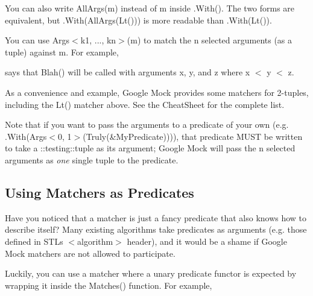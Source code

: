 You can also write {\ttfamily All\+Args(m)} instead of {\ttfamily m} inside {\ttfamily .With()}. The two forms are equivalent, but {\ttfamily .With(All\+Args(\+Lt()))} is more readable than {\ttfamily .With(\+Lt())}.

You can use {\ttfamily Args$<$k1, ..., kn$>$(m)} to match the {\ttfamily n} selected arguments (as a tuple) against {\ttfamily m}. For example,


\begin{DoxyCode}{0}
\end{DoxyCode}


says that {\ttfamily Blah()} will be called with arguments {\ttfamily x}, {\ttfamily y}, and {\ttfamily z} where {\ttfamily x $<$ y $<$ z}.

As a convenience and example, Google Mock provides some matchers for 2-\/tuples, including the {\ttfamily Lt()} matcher above. See the Cheat\+Sheet for the complete list.

Note that if you want to pass the arguments to a predicate of your own (e.\+g. {\ttfamily .With(Args$<$0, 1$>$(Truly(\&\+My\+Predicate)))}), that predicate M\+U\+ST be written to take a {\ttfamily \+::testing\+::tuple} as its argument; Google Mock will pass the {\ttfamily n} selected arguments as {\itshape one} single tuple to the predicate.

\subsection*{Using Matchers as Predicates}

Have you noticed that a matcher is just a fancy predicate that also knows how to describe itself? Many existing algorithms take predicates as arguments (e.\+g. those defined in S\+TL\textquotesingle{}s {\ttfamily $<$algorithm$>$} header), and it would be a shame if Google Mock matchers are not allowed to participate.

Luckily, you can use a matcher where a unary predicate functor is expected by wrapping it inside the {\ttfamily Matches()} function. For example,


\begin{DoxyCode}{0}
\DoxyCodeLine{}
\end{DoxyCode}


